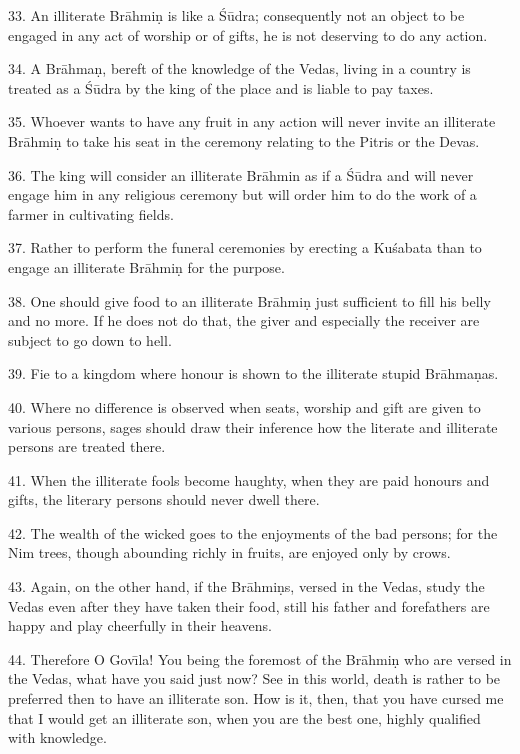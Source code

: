 33. An illiterate Br\=ahmi\d{n} is like a \'S\=udra; consequently not an object to be engaged in any act of worship or of gifts, he is not deserving to do any action.

34. A Br\=ahma\d{n}, bereft of the knowledge of the Vedas, living in a country is treated as a \'S\=udra by the king of the place and is liable to pay taxes.

35. Whoever wants to have any fruit in any action will never invite an illiterate Br\=ahmi\d{n} to take his seat in the ceremony relating to the Pitris or the Devas.

36. The king will consider an illiterate Br\=ahmin as if a \'S\=udra and will never engage him in any religious ceremony but will order him to do the work of a farmer in cultivating fields.

37. Rather to perform the funeral ceremonies by erecting a Ku\'sabata than to engage an illiterate Br\=ahmi\d{n} for the purpose.

38. One should give food to an illiterate Br\=ahmi\d{n} just sufficient to fill his belly and no more. If he does not do that, the giver and especially the receiver are subject to go down to hell.

39. Fie to a kingdom where honour is shown to the illiterate stupid Br\=ahma\d{n}as.

40. Where no difference is observed when seats, worship and gift are given to various persons, sages should draw their inference how the literate and illiterate persons are treated there.

41. When the illiterate fools become haughty, when they are paid honours and gifts, the literary persons should never dwell there.

42. The wealth of the wicked goes to the enjoyments of the bad persons; for the Nim trees, though abounding richly in fruits, are enjoyed only by crows.

43. Again, on the other hand, if the Br\=ahmi\d{n}s, versed in the Vedas, study the Vedas even after they have taken their food, still his father and forefathers are happy and play cheerfully in their heavens.

44. Therefore O Gov\={\i}la! You being the foremost of the Br\=ahmi\d{n} who are versed in the Vedas, what have you said just now? See in this world, death is rather to be preferred then to have an illiterate son. How is it, then, that you have cursed me that I would get an illiterate son, when you are the best one, highly qualified with knowledge.

